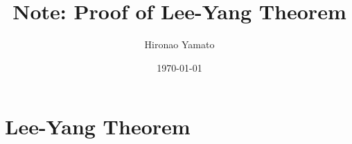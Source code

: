 \documentclass[aps, 12pt]{revtex4-2}
\begin{document}
\title{Note: Proof of Lee-Yang Theorem}
\author{Hironao Yamato}
\date{\today}
\maketitle
\section{Lee-Yang Theorem}


\end{document}
